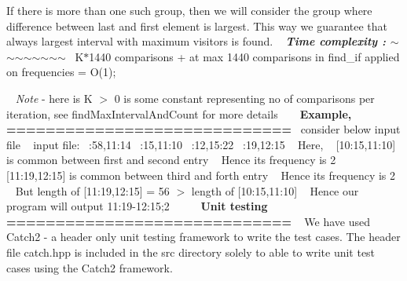 If there is more than one such group, then we will consider the group where difference between last and first element is largest. This way we guarantee that always largest interval with maximum visitors is found. ~\newline
{\bfseries{{\itshape Time complexity \+: \texorpdfstring{$\sim$}{\string~}\texorpdfstring{$\sim$}{\string~}\texorpdfstring{$\sim$}{\string~}\texorpdfstring{$\sim$}{\string~}\texorpdfstring{$\sim$}{\string~}\texorpdfstring{$\sim$}{\string~}\texorpdfstring{$\sim$}{\string~}\texorpdfstring{$\sim$}{\string~}}}}~\newline
K\texorpdfstring{$\ast$}{*}1440 comparisons + at max 1440 comparisons in find\+\_\+if applied on frequencies = O(1);

~\newline
{\itshape Note} -\/ here is K \texorpdfstring{$>$}{>} 0 is some constant representing no of comparisons per iteration, see find\+Max\+Interval\+And\+Count for more details ~\newline
~\newline
{\bfseries{Example, =============================}}~\newline
consider below input file ~\newline
input file\+: ~\+:58,11\+:14 ~\+:15,11\+:10 ~\+:12,15\+:22 ~\+:19,12\+:15 ~\newline
 Here, ~\newline
\mbox{[}10\+:15,11\+:10\mbox{]} is common between first and second entry ~\newline
Hence its frequency is 2 ~\newline
\mbox{[}11\+:19,12\+:15\mbox{]} is common between third and forth entry ~\newline
Hence its frequency is 2 ~\newline
But length of \mbox{[}11\+:19,12\+:15\mbox{]} = 56 \texorpdfstring{$>$}{>} length of \mbox{[}10\+:15,11\+:10\mbox{]} ~\newline
Hence our program will output 11\+:19-\/12\+:15;2 ~\newline
~\newline
~\newline
{\bfseries{Unit testing =============================}} ~\newline
We have used Catch2 -\/ a header only unit testing framework to write the test cases. The header file catch.\+hpp is included in the src directory solely to able to write unit test cases using the Catch2 framework.~\newline
